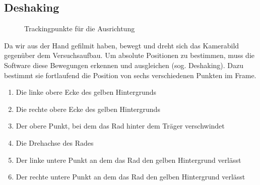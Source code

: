 \documentclass[a4paper,german,12pt,smallheadings]{scrartcl}
\begin{document}
\subsection{Deshaking}
\begin{figure}
  \caption{Trackingpunkte für die Ausrichtung}
\end{figure}

Da wir aus der Hand gefilmit haben, bewegt und dreht sich das Kamerabild
gegenüber dem Versuchsaufbau. Um absolute Positionen zu bestimmen, muss die
Software diese Bewegungen erkennen und ausgleichen (sog. Deshaking). Dazu
bestimmt sie fortlaufend die Position von sechs verschiedenen Punkten im Frame.
\begin{enumerate}
  \item Die linke obere Ecke des gelben Hintergrunds
  \item Die rechte obere Ecke des gelben Hintergrunds
  \item Der obere Punkt, bei dem das Rad hinter dem Träger verschwindet
  \item Die Drehachse des Rades
  \item Der linke untere Punkt an dem das Rad den gelben Hintergrund verlässt
  \item Der rechte untere Punkt an dem das Rad den gelben Hintergrund verlässt
\end{enumerate}
\end{document}
